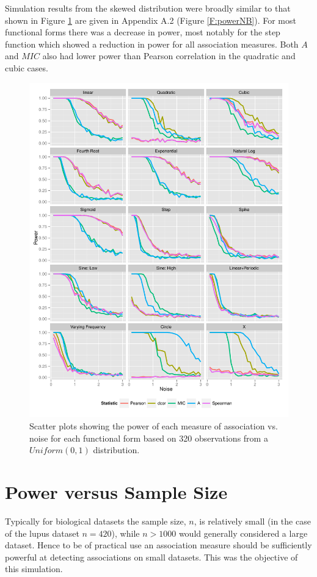 \documentclass[a4paper, 12pt]{report}
\begin{document}
Simulation results from the skewed distribution were broadly similar to that shown in Figure \ref{F:powerNU} are given in Appendix A.2 (Figure \ref{F:powerNB}). For most functional forms there was a decrease in power, most notably for the step function which showed a reduction in power for all association measures. Both $A$ and $MIC$ also had lower power than Pearson correlation in the quadratic and cubic cases.

\begin{figure}[H]
\begin{centering}
\includegraphics[width=\textwidth]{powerNoiseUN.pdf}
\caption{Scatter plots showing the power of each measure of association vs. noise for each functional form based on 320 observations from a $Uniform(0,1)$ distribution.} 
\label{F:powerNU}
\end{centering}
\end{figure}

\section{Power versus Sample Size}
Typically for biological datasets the sample size, $n$, is relatively small (in the case of the lupus dataset $n = 420$), while $n > 1000$ would generally considered a large dataset. Hence to be of practical use an association measure should be sufficiently powerful at detecting associations on small datasets. This was the objective of this simulation.  
\end{document}

